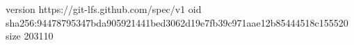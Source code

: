 version https://git-lfs.github.com/spec/v1
oid sha256:94478795347bda905921441bed3062d19e7fb39c971aae12b85444518c155520
size 203110
